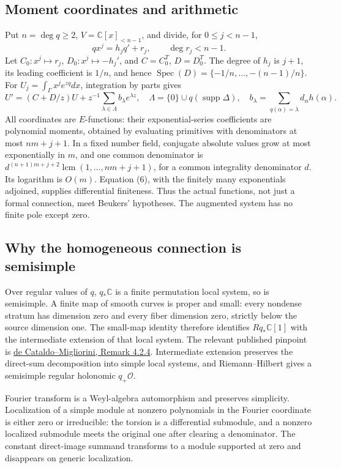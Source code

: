 \documentclass[11pt]{article}
\DeclareMathOperator{\Spec}{Spec}
\newcommand{\C}{\mathbb C}
\begin{document}
\subsection{Moment coordinates and arithmetic}
Put $n=\deg q\ge2$, $V=\C[x]_{<n-1}$, and divide, for $0\le j<n-1$,
\[
 qx^j=h_jq'+r_j,\qquad \deg r_j<n-1.
\]
Let $C_0:x^j\mapsto r_j$, $D_0:x^j\mapsto-h_j'$, and $C=C_0^T$,
$D=D_0^T$. The degree of $h_j$ is $j+1$, its leading coefficient is
$1/n$, and hence $\Spec(D)=\{-1/n,\ldots,-(n-1)/n\}$.
For $U_j=\int_\Gamma x^j e^{zq}dx$, integration by parts gives
\[
 U'=(C+D/z)U+z^{-1}\sum_{\lambda\in\Lambda} b_\lambda e^{\lambda z},
 \quad \Lambda=\{0\}\cup q(\operatorname{supp}\Delta),
 \quad b_\lambda=\sum_{q(\alpha)=\lambda}d_\alpha h(\alpha).   \tag{6}
\]
All coordinates are $E$-functions: their exponential-series coefficients
are polynomial moments, obtained by evaluating primitives with denominators
at most $nm+j+1$. In a fixed number field, conjugate absolute values grow
at most exponentially in $m$, and one common denominator is
$d^{(n+1)m+j+2}\operatorname{lcm}(1,\ldots,nm+j+1)$, for a common
integrality denominator $d$. Its logarithm is $O(m)$. Equation (6), with
the finitely many exponentials adjoined, supplies differential finiteness.
Thus the actual functions, not just a formal connection, meet Beukers'
hypotheses. The augmented system has no finite pole except zero.

\subsection{Why the homogeneous connection is semisimple}
Over regular values of $q$, $q_*\C$ is a finite permutation local system,
so is semisimple. A finite map of smooth curves is proper and small:
every nondense stratum has dimension zero and every fiber dimension zero,
strictly below the source dimension one. The small-map identity therefore
identifies $Rq_*\C[1]$ with the intermediate extension of that local
system. The relevant published pinpoint is
\href{https://arxiv.org/abs/0712.0349}{de Cataldo--Migliorini, Remark 4.2.4}.
Intermediate extension preserves the direct-sum decomposition into simple
local systems, and Riemann--Hilbert gives a semisimple regular holonomic
$q_+\mathcal O$.

Fourier transform is a Weyl-algebra automorphism and preserves simplicity.
Localization of a simple module at nonzero polynomials in the Fourier
coordinate is either zero or irreducible: the torsion is a differential
submodule, and a nonzero localized submodule meets the original one after
clearing a denominator. The constant direct-image summand transforms to
a module supported at zero and disappears on generic localization.
\end{document}

